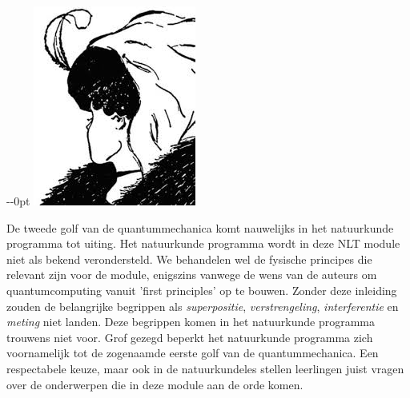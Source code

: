 \documentclass[../../main.tex]{subfiles}
\begin{document}
\newpage

\checkoddpage\ifoddpage 
    \def\xoff{0in}
  \else 
    \def\xoff{-\marginparsep-\marginparwidth}
  \fi
\begin{adjustwidth}{\xoff}{0pt}
\includegraphics[width=\textwidth+\marginparsep+\marginparwidth]{./img/ovjv.png}
\end{adjustwidth}




\iffalse%
De tweede golf van de quantummechanica komt nauwelijks in het natuurkunde programma tot uiting. Het natuurkunde programma wordt in deze NLT module niet als bekend verondersteld. We behandelen wel de fysische principes die relevant zijn voor de module, enigszins vanwege de wens van de auteurs om quantumcomputing vanuit 'first principles' op te bouwen. 
Zonder deze inleiding zouden de belangrijke begrippen als \textit{superpositie}, \textit{verstrengeling}, \textit{interferentie} en \textit{meting} niet landen.
Deze begrippen komen in het natuurkunde programma trouwens niet voor. Grof gezegd beperkt het natuurkunde programma zich voornamelijk tot de zogenaamde eerste golf van de quantummechanica. Een respectabele keuze, maar ook in de natuurkundeles stellen leerlingen juist vragen over de onderwerpen die in deze module aan de orde komen. 
\end{document}
